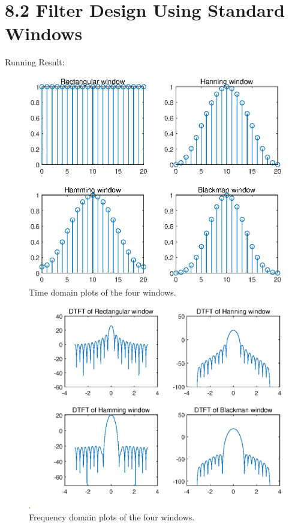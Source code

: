 \documentclass[onecolumn,oneside]{SUSTechHomework}
\begin{document}
\section*{8.2 Filter Design Using Standard Windows}
Running Result:
\begin{figure}[H]
	\centering
	\includegraphics[width=150mm]{pictures/window1.eps}
	\caption{Time domain plots of the four windows.}
\end{figure}
\begin{figure}[H]
	\centering
	\includegraphics[width=150mm]{pictures/window2.eps}
	\caption{Frequency domain plots of the four windows.}
\end{figure}
\end{document}
